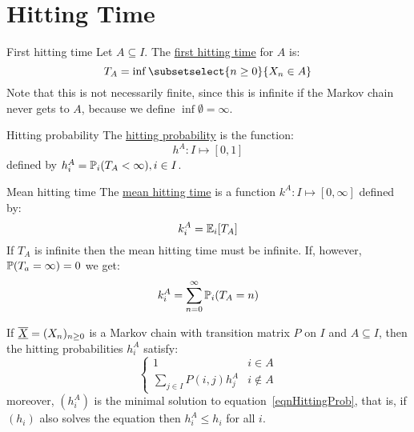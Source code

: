 \documentclass[../Main.tex]{subfiles}
\begin{document}
\section{Hitting Time}
\begin{definition}{First hitting time}
    Let $A \subseteq I$. The \underline{first hitting time} for $A$ is:
    \begin{equation*}
        T_A = \inf \subsetselect{n \geq 0}{X_n \in A}
    \end{equation*}
    Note that this is not necessarily finite, since this is infinite if the Markov chain never gets to $A$, because we define $\inf \emptyset = \infty$.
\end{definition}
\begin{definition}{Hitting probability}
    The \underline{hitting probability} is the function:
    \begin{equation*}
        h^A : I \mapsto [0, 1]
    \end{equation*}
    defined by $h_i^A = \P_i(T_A < \infty), i \in I$.
\end{definition}
\begin{definition}{Mean hitting time}
    The \underline{mean hitting time} is a function $k^A : I \mapsto [0, \infty]$ defined by:
    \begin{equation*}
        k_i^A = \E_i[T_A]
    \end{equation*}
    If $T_A$ is infinite then the mean hitting time must be infinite. If, however, $\P(T_a = \infty) = 0$ we get:
    \begin{equation*}
        k_i^A = \sum_{n = 0}^\infty \P_i (T_A = n)
    \end{equation*}
\end{definition}
\begin{theorem}
    If $\chain{X} = (X_n)_{n\geq 0}$ is a Markov chain with transition matrix $P$ on $I$ and $A \subseteq I$, then the hitting probabilities $h_i^A$ satisfy:
    \begin{equation}
        \begin{cases}
            1 & i \in A \\
            \sum_{j \in I} P(i, j) h_j^A & i \notin A
        \end{cases}
        \label{eqnHittingProb}
    \end{equation}
    moreover, $(h_i^A)$ is the minimal solution to equation~\ref{eqnHittingProb}, that is, if $(h_i)$ also solves the equation then $h_i^A \leq h_i$ for all $i$.
    \label{thmHittingProb}
\end{theorem}
\end{document}
